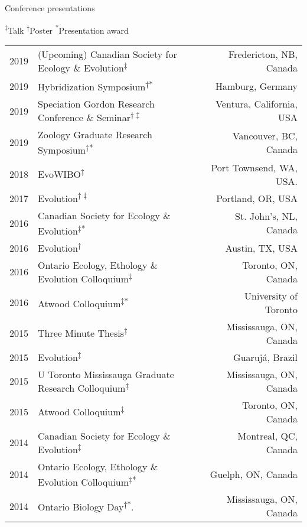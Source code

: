 \documentclass[11pt]{article}
\begin{document}
\vspace{0.5em}


\noindent
\begin{rSection}{Conference presentations} %


\textsuperscript{$\ddagger$}Talk
\textsuperscript{$\dag$}Poster
\textsuperscript{*}Presentation award

\vspace{0.5em}
\noindent
\begin{tabular}{llr}

2019 & (Upcoming) Canadian Society for Ecology \& Evolution\textsuperscript{$\ddagger$} & Fredericton, NB, Canada\\
2019 & Hybridization Symposium\textsuperscript{$\dag$*} & Hamburg, Germany\\
2019 & Speciation Gordon Research Conference \& Seminar\textsuperscript{$\dag\ddagger$} & Ventura, California, USA\\
2019 & Zoology Graduate Research Symposium\textsuperscript{$\dag$*} & Vancouver, BC, Canada\\
2018 & EvoWIBO\textsuperscript{$\ddagger$} & Port Townsend, WA, USA.\\
2017 & Evolution\textsuperscript{$\dag\ddagger$} & Portland, OR, USA\\
2016 & Canadian Society for Ecology \& Evolution\textsuperscript{$\ddagger$*} & St. John’s, NL, Canada\\
2016 & Evolution\textsuperscript{$\dag$} & Austin, TX, USA\\
2016 & Ontario Ecology, Ethology \& Evolution Colloquium\textsuperscript{$\ddagger$} & Toronto, ON, Canada\\
2016 & Atwood Colloquium\textsuperscript{$\ddagger$*} & University of Toronto\\
2015 & Three Minute Thesis\textsuperscript{$\ddagger$} & Mississauga, ON, Canada\\
2015 & Evolution\textsuperscript{$\ddagger$} & Guaruj\'a, Brazil\\
2015 & U Toronto Mississauga Graduate Research Colloquium\textsuperscript{$\ddagger$} & Mississauga, ON, Canada\\
2015 & Atwood Colloquium\textsuperscript{$\ddagger$} & Toronto, ON, Canada\\
2014 & Canadian Society for Ecology \& Evolution\textsuperscript{$\ddagger$} & Montreal, QC, Canada\\
2014 & Ontario Ecology, Ethology \& Evolution Colloquium\textsuperscript{$\ddagger$*} & Guelph, ON, Canada\\
2014 & Ontario Biology Day\textsuperscript{$\dagger$*}. & Mississauga, ON, Canada\\
\end{tabular}

\end{rSection}
\vspace{1em}
\end{document}
